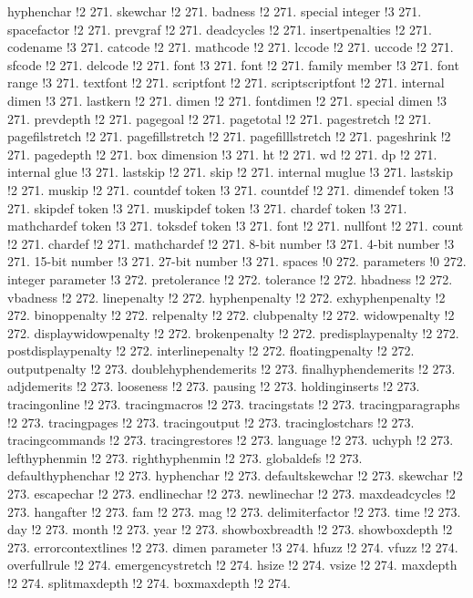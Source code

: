 hyphenchar !2 271.
skewchar !2 271.
badness !2 271.
special integer !3 271.
spacefactor !2 271.
prevgraf !2 271.
deadcycles !2 271.
insertpenalties !2 271.
codename !3 271.
catcode !2 271.
mathcode !2 271.
lccode !2 271.
uccode !2 271.
sfcode !2 271.
delcode !2 271.
font !3 271.
font !2 271.
family member !3 271.
font range !3 271.
textfont !2 271.
scriptfont !2 271.
scriptscriptfont !2 271.
internal dimen !3 271.
lastkern !2 271.
dimen !2 271.
fontdimen !2 271.
special dimen !3 271.
prevdepth !2 271.
pagegoal !2 271.
pagetotal !2 271.
pagestretch !2 271.
pagefilstretch !2 271.
pagefillstretch !2 271.
pagefilllstretch !2 271.
pageshrink !2 271.
pagedepth !2 271.
box dimension !3 271.
ht !2 271.
wd !2 271.
dp !2 271.
internal glue !3 271.
lastskip !2 271.
skip !2 271.
internal muglue !3 271.
lastskip !2 271.
muskip !2 271.
countdef token !3 271.
countdef !2 271.
dimendef token !3 271.
skipdef token !3 271.
muskipdef token !3 271.
chardef token !3 271.
mathchardef token !3 271.
toksdef token !3 271.
font !2 271.
nullfont !2 271.
count !2 271.
chardef !2 271.
mathchardef !2 271.
8-bit number !3 271.
4-bit number !3 271.
15-bit number !3 271.
27-bit number !3 271.
spaces !0 272.
parameters !0 272.
integer parameter !3 272.
pretolerance !2 272.
tolerance !2 272.
hbadness !2 272.
vbadness !2 272.
linepenalty !2 272.
hyphenpenalty !2 272.
exhyphenpenalty !2 272.
binoppenalty !2 272.
relpenalty !2 272.
clubpenalty !2 272.
widowpenalty !2 272.
displaywidowpenalty !2 272.
brokenpenalty !2 272.
predisplaypenalty !2 272.
postdisplaypenalty !2 272.
interlinepenalty !2 272.
floatingpenalty !2 272.
outputpenalty !2 273.
doublehyphendemerits !2 273.
finalhyphendemerits !2 273.
adjdemerits !2 273.
looseness !2 273.
pausing !2 273.
holdinginserts !2 273.
tracingonline !2 273.
tracingmacros !2 273.
tracingstats !2 273.
tracingparagraphs !2 273.
tracingpages !2 273.
tracingoutput !2 273.
tracinglostchars !2 273.
tracingcommands !2 273.
tracingrestores !2 273.
language !2 273.
uchyph !2 273.
lefthyphenmin !2 273.
righthyphenmin !2 273.
globaldefs !2 273.
defaulthyphenchar !2 273.
hyphenchar !2 273.
defaultskewchar !2 273.
skewchar !2 273.
escapechar !2 273.
endlinechar !2 273.
newlinechar !2 273.
maxdeadcycles !2 273.
hangafter !2 273.
fam !2 273.
mag !2 273.
delimiterfactor !2 273.
time !2 273.
day !2 273.
month !2 273.
year !2 273.
showboxbreadth !2 273.
showboxdepth !2 273.
errorcontextlines !2 273.
dimen parameter !3 274.
hfuzz !2 274.
vfuzz !2 274.
overfullrule !2 274.
emergencystretch !2 274.
hsize !2 274.
vsize !2 274.
maxdepth !2 274.
splitmaxdepth !2 274.
boxmaxdepth !2 274.
